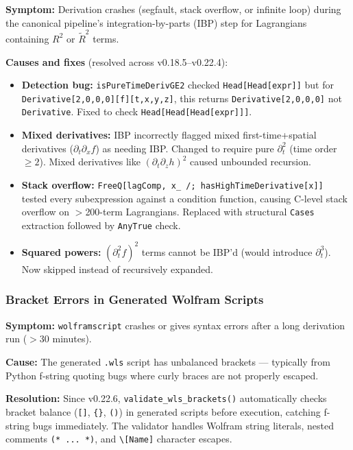 \textbf{Symptom:} Derivation crashes (segfault, stack overflow, or infinite loop) during the canonical pipeline's integration-by-parts (IBP) step for Lagrangians containing $R^2$ or $\tilde{R}^2$ terms.

\textbf{Causes and fixes} (resolved across v0.18.5--v0.22.4):
\begin{itemize}
  \item \textbf{Detection bug:} \texttt{isPureTimeDerivGE2} checked \texttt{Head[Head[expr]]} but for \texttt{Derivative[2,0,0,0][f][t,x,y,z]}, this returns \texttt{Derivative[2,0,0,0]} not \texttt{Derivative}. Fixed to check \texttt{Head[Head[Head[expr]]]}.
  \item \textbf{Mixed derivatives:} IBP incorrectly flagged mixed first-time+spatial derivatives ($\partial_t \partial_x f$) as needing IBP. Changed to require pure $\partial_t^2$ (time order $\geq 2$). Mixed derivatives like $(\partial_t \partial_z h)^2$ caused unbounded recursion.
  \item \textbf{Stack overflow:} \texttt{FreeQ[lagComp, x\_ /; hasHighTimeDerivative[x]]} tested every subexpression against a condition function, causing C-level stack overflow on $>$200-term Lagrangians. Replaced with structural \texttt{Cases} extraction followed by \texttt{AnyTrue} check.
  \item \textbf{Squared powers:} $(\partial_t^2 f)^2$ terms cannot be IBP'd (would introduce $\partial_t^3$). Now skipped instead of recursively expanded.
\end{itemize}

\subsubsection{Bracket Errors in Generated Wolfram Scripts}
\label{sec:bracket-validation}

\textbf{Symptom:} \texttt{wolframscript} crashes or gives syntax errors after a long derivation run ($>$30 minutes).

\textbf{Cause:} The generated \texttt{.wls} script has unbalanced brackets --- typically from Python f-string quoting bugs where curly braces are not properly escaped.

\textbf{Resolution:} Since v0.22.6, \texttt{validate\_wls\_brackets()} automatically checks bracket balance (\texttt{[]}, \texttt{\{\}}, \texttt{()}) in generated scripts before execution, catching f-string bugs immediately. The validator handles Wolfram string literals, nested comments \texttt{(* ... *)}, and \texttt{\textbackslash[Name]} character escapes.

